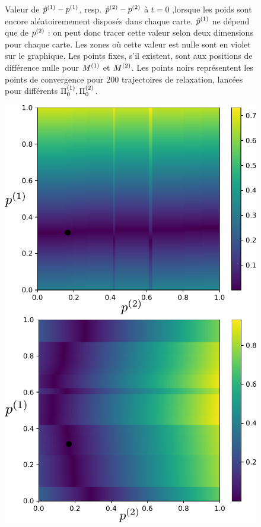 \documentclass[../main]{subfiles}
\begin{document}
\begin{figure}
\begin{minipage}{0.5\textwidth}
\end{minipage}
\caption{Valeur de ${\hat{p}}^{({1})} - p^{({1})}$, resp. ${\hat{p}}^{({2})} - p^{({2})}$ à $t=0$ ,lorsque les poids sont encore aléatoiremement disposés dans chaque carte.
 ${\hat{p}}^{({1})}$ ne dépend que de $p^{({2})}$ : on peut donc tracer cette valeur selon deux dimensions pour chaque carte. Les zones où cette valeur est nulle sont en violet sur le graphique. Les points fixes, s'il existent, sont aux positions de différence nulle pour $M^{({1})}$ et $M^{({2})}$. Les points noirs représentent les points de convergence pour 200 trajectoires de relaxation, lancées pour différents $\Pi_0^{({1})}, \Pi_0^{({2})}$.}
 
\label{fig:diff_relax_t1_notraj}
\end{figure}

\begin{figure}
\begin{minipage}{0.5\textwidth}
\centering
\includegraphics[width=\textwidth]{champ_X_006_notraj.pdf}
\end{minipage}
\begin{minipage}{0.5\textwidth}
\centering
\includegraphics[width=\textwidth]{champ_Y_006_notraj.pdf}

\end{minipage}
\end{figure}
\end{document}
